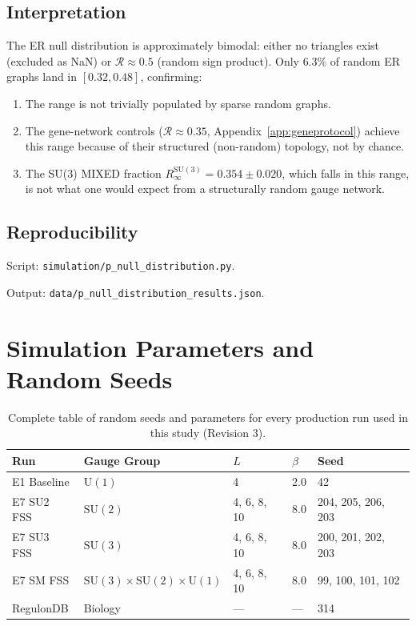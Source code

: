 \documentclass[12pt,a4paper]{article}
\newcommand{\R}{\mathcal{R}}           %
\newcommand{\SU}[1]{\mathrm{SU}(#1)}
\newcommand{\UN}[1]{\mathrm{U}(#1)}
\newcommand{\SM}{\SU{3}\!\times\!\SU{2}\!\times\!\UN{1}}
\theoremstyle{plain}
\theoremstyle{definition}
\theoremstyle{remark}
\begin{document}
\subsection*{Interpretation}

The ER null distribution is approximately bimodal: either no triangles exist (excluded
as NaN) or $\R\approx0.5$ (random sign product).
Only $6.3\%$ of random ER graphs land in $[0.32,0.48]$, confirming:
\begin{enumerate}
  \item The range is not trivially populated by sparse random graphs.
  \item The gene-network controls ($\R\approx0.35$, Appendix~\ref{app:geneprotocol})
        achieve this range because of their structured (non-random) topology, not by
        chance.
  \item The SU(3) MIXED fraction $R_\infty^{\SU{3}}=0.354\pm0.020$, which falls in
        this range, is not what one would expect from a structurally random gauge
        network.
\end{enumerate}

\subsection*{Reproducibility}

Script: \texttt{simulation/p\_null\_distribution.py}.

Output: \texttt{data/p\_null\_distribution\_results.json}.

\section{Simulation Parameters and Random Seeds}
\label{app:seeds}

\begin{table}[H]
\centering
\caption{Complete table of random seeds and parameters for every production run used in this study (Revision 3).}
\label{tab:sim-params}
\small
\begin{tabular}{lllll}
\toprule
Run & Gauge Group & $L$ & $\beta$ & Seed \\
\midrule
E1 Baseline & $\UN{1}$ & 4 & 2.0 & 42 \\
E7 SU2 FSS & $\SU{2}$ & 4, 6, 8, 10 & 8.0 & 204, 205, 206, 203 \\
E7 SU3 FSS & $\SU{3}$ & 4, 6, 8, 10 & 8.0 & 200, 201, 202, 203 \\
E7 SM FSS & $\SM$ & 4, 6, 8, 10 & 8.0 & 99, 100, 101, 102 \\
RegulonDB & Biology & --- & --- & 314 \\
\bottomrule
\end{tabular}
\end{table}
\end{document}
